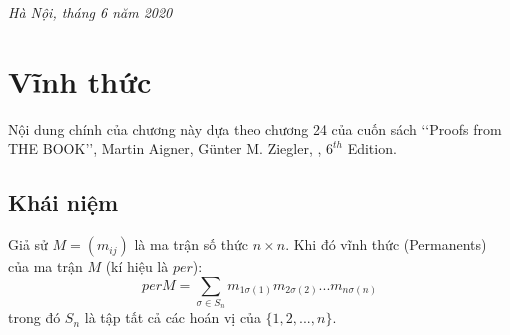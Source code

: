 \documentclass[a4paper, 12pt]{report}
\begin{document}
\hspace*{9cm}\textit{Hà Nội, tháng 6 năm 2020}
	
\hspace*{9.5cm}
	
\hspace*{10cm}

\chapter{Vĩnh thức}
Nội dung chính của chương này dựa theo chương 24 của cuốn sách ‘‘Proofs from THE BOOK’’, Martin Aigner, Günter M. Ziegler, , $6^{th}$ Edition.
\section{Khái niệm}
Giả sử $M= (m_{ij})$ là ma trận số thức $n \times n$. Khi đó vĩnh thức (Permanents) của ma trận $M$ (kí hiệu là $per$):
\begin{equation*}
per M = \displaystyle \sum_{\sigma \in S_{n}}m_{1\sigma(1)}m_{2\sigma(2)}...m_{n\sigma(n)}
\end{equation*}
trong đó $S_{n}$ là tập tất cả các hoán vị của $\{1,2,...,n\}$.
\end{document}
